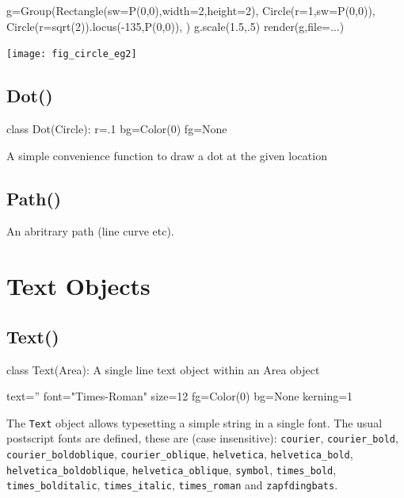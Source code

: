 \documentclass[a4paper]{book}
\begin{document}
\begin{example}
\begin{python}
g=Group(Rectangle(sw=P(0,0),width=2,height=2),
        Circle(r=1,sw=P(0,0)),
        Circle(r=sqrt(2)).locus(-135,P(0,0)),
        )
g.scale(1.5,.5)
render(g,file=...)
\end{python}
\begin{center}
  \texttt{[image: fig\_circle\_eg2]}
\end{center}
\end{example}

\subsection{Dot()}
\label{sec:dot}
\begin{python}
class Dot(Circle):
    r=.1
    bg=Color(0)
    fg=None
\end{python}

A simple convenience function to draw a dot at the given location

\subsection{Path()}
\label{sec:path}

An abritrary path (line curve etc).

\section{Text Objects}

\subsection{Text()}
\label{sec:text}
\begin{python}
class Text(Area):
    A single line text object within an Area object
    
    text=''
    font="Times-Roman"
    size=12
    fg=Color(0)
    bg=None
    kerning=1
\end{python}
The \Verb|Text| object allows typesetting a simple string in a single
font. The usual postscript fonts are defined, these are (case
insensitive): \Verb|courier|, \Verb|courier_bold|,
\Verb|courier_boldoblique|, \Verb|courier_oblique|, \Verb|helvetica|,
\Verb|helvetica_bold|, \Verb|helvetica_boldoblique|,
\Verb|helvetica_oblique|, \Verb|symbol|, \Verb|times_bold|,
\Verb|times_bolditalic|, \Verb|times_italic|, \Verb|times_roman| and
\Verb|zapfdingbats|.
\end{document}
